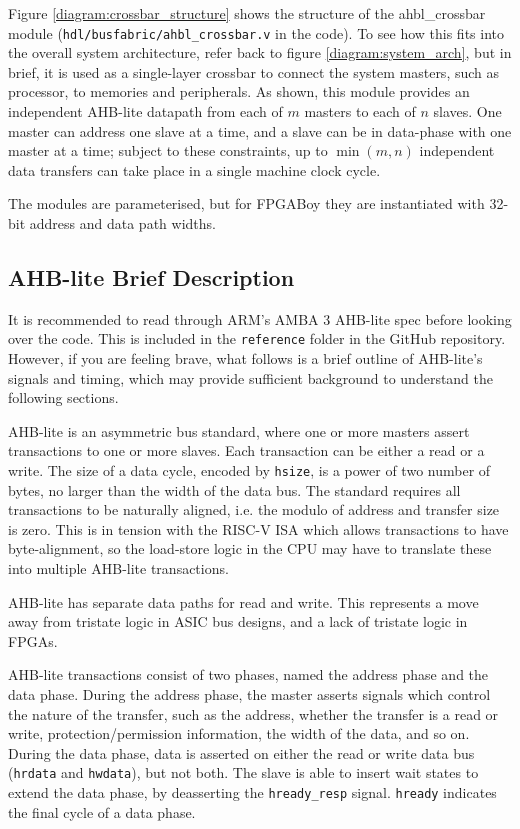 \documentclass{article}
\begin{document}
Figure \ref{diagram:crossbar_structure} shows the structure of the ahbl\_crossbar module (\texttt{hdl/busfabric/ahbl\_crossbar.v} in the code). To see how this fits into the overall system architecture, refer back to figure \ref{diagram:system_arch}, but in brief, it is used as a single-layer crossbar to connect the system masters, such as processor, to memories and peripherals. As shown, this module provides an independent AHB-lite datapath from each of $m$ masters to each of $n$ slaves. One master can address one slave at a time, and a slave can be in data-phase with one master at a time; subject to these constraints, up to $\min(m,n)$ independent data transfers can take place in a single machine clock cycle.

The modules are parameterised, but for FPGABoy they are instantiated with 32-bit address and data path widths.

\subsection{AHB-lite Brief Description}

It is recommended to read through ARM's AMBA 3 AHB-lite spec before looking over the code. This is included in the \texttt{reference} folder in the GitHub repository. However, if you are feeling brave, what follows is a brief outline of AHB-lite's signals and timing, which may provide sufficient background to understand the following sections.

AHB-lite is an asymmetric bus standard, where one or more masters assert transactions to one or more slaves. Each transaction can be either a read or a write. The size of a data cycle, encoded by \texttt{hsize}, is a power of two number of bytes, no larger than the width of the data bus. The standard requires all transactions to be naturally aligned, i.e. the modulo of address and transfer size is zero. This is in tension with the RISC-V ISA which allows transactions to have byte-alignment, so the load-store logic in the CPU may have to translate these into multiple AHB-lite transactions.

AHB-lite has separate data paths for read and write. This represents a move away from tristate logic in ASIC bus designs, and a lack of tristate logic in FPGAs.

AHB-lite transactions consist of two phases, named the address phase and the data phase. During the address phase, the master asserts signals which control the nature of the transfer, such as the address, whether the transfer is a read or write, protection/permission information, the width of the data, and so on. During the data phase, data is asserted on either the read or write data bus (\texttt{hrdata} and \texttt{hwdata}), but not both. The slave is able to insert wait states to extend the data phase, by deasserting the \texttt{hready\_resp} signal. \texttt{hready} indicates the final cycle of a data phase.
\end{document}
